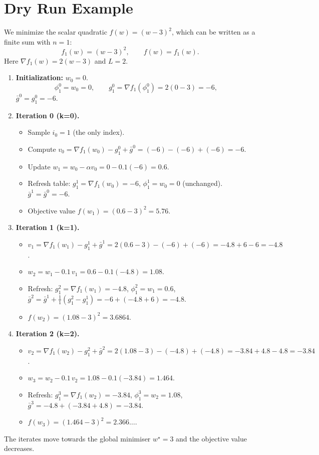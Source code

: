 \documentclass{article}
\newcommand{\grad}{\nabla}
\begin{document}
\section*{Dry Run Example}
We minimize the scalar quadratic $f(w)=(w-3)^{2}$, which can be written as a finite sum with $n=1$:
\[
f_{1}(w)=(w-3)^{2},\qquad f(w)=f_{1}(w).
\]
Here $\grad f_{1}(w)=2(w-3)$ and $L=2$.

\begin{enumerate}[label=\textbf{Iter \arabic*:},leftmargin=*,itemsep=1ex]
\item \textbf{Initialization:} $w_{0}=0$.
    \[
    \phi_{1}^{0}=w_{0}=0,\qquad g_{1}^{0}= \grad f_{1}(\phi_{1}^{0})=2(0-3)=-6,
    \]
    $\bar g^{0}=g_{1}^{0}=-6$.
\item \textbf{Iteration 0 (k=0).}
    \begin{itemize}
        \item Sample $i_{0}=1$ (the only index).
        \item Compute $v_{0}= \grad f_{1}(w_{0})-g_{1}^{0}+\bar g^{0}
                 =(-6)-(-6)+(-6)=-6$.
        \item Update $w_{1}=w_{0}-\alpha v_{0}=0-0.1(-6)=0.6$.
        \item Refresh table:
            $g_{1}^{1}= \grad f_{1}(w_{0})=-6$, $\phi_{1}^{1}=w_{0}=0$ (unchanged).
            $\bar g^{1}= \bar g^{0}= -6$.
        \item Objective value $f(w_{1})=(0.6-3)^{2}=5.76$.
    \end{itemize}
\item \textbf{Iteration 1 (k=1).}
    \begin{itemize}
        \item $v_{1}= \grad f_{1}(w_{1})-g_{1}^{1}+\bar g^{1}
                 =2(0.6-3)-(-6)+(-6)= -4.8+6-6=-4.8$.
        \item $w_{2}=w_{1}-0.1\,v_{1}=0.6-0.1(-4.8)=1.08$.
        \item Refresh: $g_{1}^{2}= \grad f_{1}(w_{1})=-4.8$, $\phi_{1}^{2}=w_{1}=0.6$,
            $\bar g^{2}= \bar g^{1}+ \frac{1}{1}(g_{1}^{2}-g_{1}^{1})
                       =-6+(-4.8+6)= -4.8$.
        \item $f(w_{2})=(1.08-3)^{2}=3.6864$.
    \end{itemize}
\item \textbf{Iteration 2 (k=2).}
    \begin{itemize}
        \item $v_{2}= \grad f_{1}(w_{2})-g_{1}^{2}+\bar g^{2}
                 =2(1.08-3)-(-4.8)+(-4.8)= -3.84+4.8-4.8=-3.84$.
        \item $w_{3}=w_{2}-0.1\,v_{2}=1.08-0.1(-3.84)=1.464$.
        \item Refresh: $g_{1}^{3}= \grad f_{1}(w_{2})=-3.84$, $\phi_{1}^{3}=w_{2}=1.08$,
            $\bar g^{3}= -4.8+(-3.84+4.8)= -3.84$.
        \item $f(w_{3})=(1.464-3)^{2}=2.366\ldots$.
    \end{itemize}
\end{enumerate}
The iterates move towards the global minimiser $w^{\star}=3$ and the objective value decreases.
\end{document}
